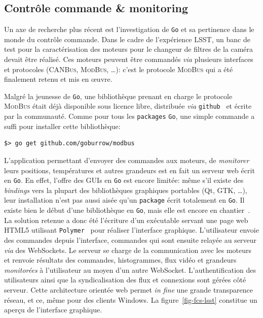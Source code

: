 \documentclass[a4paper,french]{article}
\begin{document}
\subsection{Contr\^ole commande \& monitoring}

Un axe de recherche plus r\'ecent est l'investigation de \texttt{Go} et sa
pertinence dans le monde du contr\^ole commande.
Dans le cadre de l'exp\'erience LSST, un banc de test pour la caract\'erisation
des moteurs pour le changeur de filtres de la cam\'era devait \^etre
r\'ealis\'e.
Ces moteurs peuvent \^etre command\'es \emph{via} plusieurs interfaces et
protocoles (\textsc{CANBus}, \textsc{ModBus}, \ldots): c'est le protocole
\textsc{ModBus} qui a \'et\'e finalement retenu et mis en \oe uvre.

Malgr\'e la jeunesse de \texttt{Go}, une biblioth\`eque prenant en charge le
protocole \textsc{ModBus} \'etait d\'ej\`a disponible sous licence libre,
distribu\'ee \emph{via} \texttt{github}~\cite{ref-go-modbus} et \'ecrite par la
communaut\'e.
Comme pour tous les \texttt{packages} \texttt{Go}, une simple commande a suffi
pour installer cette biblioth\`eque:

\begin{center}
\begin{verbatim}
$> go get github.com/goburrow/modbus
\end{verbatim}
\end{center}

L'application permettant d'envoyer des commandes aux moteurs, de
\emph{monitorer} leurs positions, temp\'eratures et autres grandeurs est en fait
un serveur web \'ecrit en \texttt{Go}.
En effet, l'offre des GUIs en \texttt{Go} est encore limit\'ee: m\^eme s'il
existe des \emph{bindings} vers la plupart des biblioth\`eques graphiques
portables (Qt, GTK, \ldots), leur installation n'est pas aussi ais\'ee qu'un
\texttt{package} \'ecrit totalement en \texttt{Go}.
Il existe bien le d\'ebut d'une biblioth\`eque en \texttt{Go}, mais elle est
encore en chantier~\cite{ref-go-shiny}.
La solution retenue a donc \'et\'e l'\'ecriture d'un ex\'ecutable servant une
page web HTML5 utilisant \texttt{Polymer}~\cite{ref-polymer} pour r\'ealiser
l'interface graphique.
L'utilisateur envoie des commandes depuis l'interface, commandes qui sont
ensuite relay\'ee au serveur \emph{via} des WebSockets.
Le serveur se charge de la communication avec les moteurs et renvoie
r\'esultats des commandes, histogrammes, flux vid\'eo et grandeurs
\emph{monitor\'ees} \`a l'utilisateur au moyen d'un autre WebSocket.
L'authentification des utilisateurs ainsi que la syndicalisation des flux et
connexions sont g\'er\'ees c\^ot\'e serveur.
Cette architecture orient\'ee web permet \emph{in fine} une grande transparence
r\'eseau, et ce, m\^eme pour des clients Windows.
La figure~\ref{fig-fcs-lsst} constitue un aper\c cu de l'interface graphique.
\end{document}
